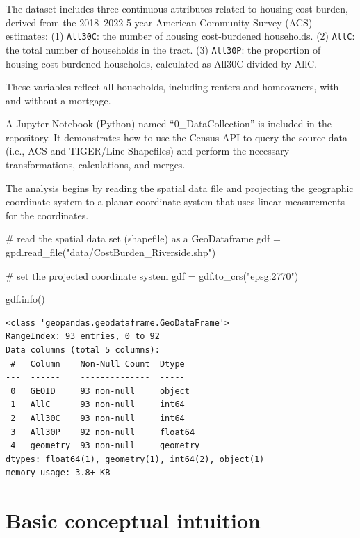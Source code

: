 \documentclass[
]{aft}
\newenvironment{Shaded}{\begin{snugshade}}{\end{snugshade}}
\newcommand{\CommentTok}[1]{\textcolor[rgb]{0.37,0.37,0.37}{#1}}
\newcommand{\NormalTok}[1]{\textcolor[rgb]{0.00,0.23,0.31}{#1}}
\newcommand{\OperatorTok}[1]{\textcolor[rgb]{0.37,0.37,0.37}{#1}}
\newcommand{\StringTok}[1]{\textcolor[rgb]{0.13,0.47,0.30}{#1}}
\begin{document}
The dataset includes three continuous attributes related to housing cost
burden, derived from the 2018--2022 5-year American Community Survey
(ACS) estimates: (1) \texttt{All30C}: the number of housing
cost-burdened households. (2) \texttt{AllC}: the total number of
households in the tract. (3) \texttt{All30P}: the proportion of housing
cost-burdened households, calculated as All30C divided by AllC.

These variables reflect all households, including renters and
homeowners, with and without a mortgage.

A Jupyter Notebook (Python) named ``0\_DataCollection'' is included in
the repository. It demonstrates how to use the Census API to query the
source data (i.e., ACS and TIGER/Line Shapefiles) and perform the
necessary transformations, calculations, and merges.

The analysis begins by reading the spatial data file and projecting the
geographic coordinate system to a planar coordinate system that uses
linear measurements for the coordinates.

\begin{Shaded}
\begin{Highlighting}[]
\CommentTok{\# read the spatial data set (shapefile) as a GeoDataframe}
\NormalTok{gdf }\OperatorTok{=}\NormalTok{ gpd.read\_file(}\StringTok{"data/CostBurden\_Riverside.shp"}\NormalTok{)}

\CommentTok{\# set the projected coordinate system}
\NormalTok{gdf }\OperatorTok{=}\NormalTok{ gdf.to\_crs(}\StringTok{"epsg:2770"}\NormalTok{)}

\NormalTok{gdf.info()}
\end{Highlighting}
\end{Shaded}

\begin{verbatim}
<class 'geopandas.geodataframe.GeoDataFrame'>
RangeIndex: 93 entries, 0 to 92
Data columns (total 5 columns):
 #   Column    Non-Null Count  Dtype   
---  ------    --------------  -----   
 0   GEOID     93 non-null     object  
 1   AllC      93 non-null     int64   
 2   All30C    93 non-null     int64   
 3   All30P    92 non-null     float64 
 4   geometry  93 non-null     geometry
dtypes: float64(1), geometry(1), int64(2), object(1)
memory usage: 3.8+ KB
\end{verbatim}

\section{Basic conceptual intuition}\label{sec-intuition}
\end{document}
